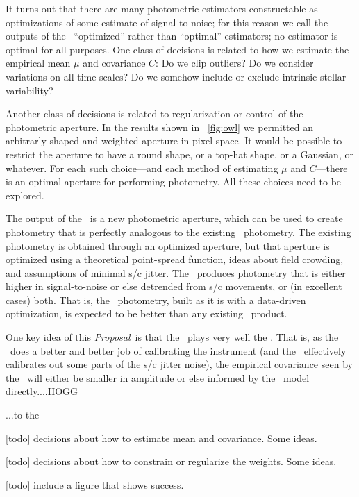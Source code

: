 \documentclass[letterpaper,12pt,preprint]{hack_aastex}
\newcommand{\documentname}{\textsl{Proposal}}
\begin{document}

It turns out that there are many photometric estimators constructable as
optimizations of some estimate of signal-to-noise; for this reason we call 
the outputs of the \OWL\ ``optimized'' rather than ``optimal'' estimators;
no estimator is optimal for all purposes.
One class of decisions is related to how we estimate the empirical mean $\mu$
and covariance $C$:
Do we clip outliers?
Do we consider variations on all time-scales?
Do we somehow include or exclude intrinsic stellar variability?

Another class of decisions is related to regularization or control of the
photometric aperture.
In the results shown in \figurename~\ref{fig:owl} we permitted an arbitrarly
shaped and weighted aperture in pixel space.
It would be possible to restrict the aperture to have a round shape, or a
top-hat shape, or a Gaussian, or whatever.
For each such choice---and each method of estimating $\mu$ and $C$---there is
an optimal aperture for performing photometry.
All these choices need to be explored.

The output of the \OWL\ is a new photometric aperture, which can be used to
create photometry that is perfectly analogous to the existing \Kepler\
photometry.
The existing photometry is obtained through an optimized aperture, but that
aperture is optimized using a theoretical point-spread function, ideas about
field crowding, and assumptions of minimal s/c jitter.
The \OWL\ produces photometry that is either higher in signal-to-noise or else
detrended from s/c movements, or (in excellent cases) both.
That is, the \OWL\ photometry, built as it is with a data-driven optimization,
is expected to be better than any existing \Kepler\ product.

One key idea of this \documentname\ is that the \OWL\ plays very well the \PLM.
That is, as the \PLM\ does a better and better job of calibrating the
instrument (and the \PLM\ effectively calibrates out some parts of the s/c
jitter noise), the empirical covariance seen by the \OWL\ will either be
smaller in amplitude or else informed by the \PLM\ model directly....HOGG

...to the 

[todo] decisions about how to estimate mean and covariance.  Some ideas.

[todo] decisions about how to constrain or regularize the weights.  Some ideas.

[todo] include a figure that shows success.
\end{document}
